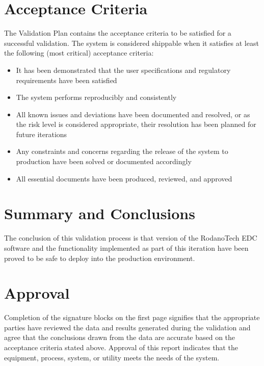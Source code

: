 \documentclass[11pt,a4paper,oneside]{article}
\begin{document}



\section{Acceptance Criteria}
The Validation Plan contains the acceptance criteria to be satisfied for a successful validation. The system is considered shippable when it satisfies at least the following (most critical) acceptance criteria:

\begin{itemize}
	\item It has been demonstrated that the user specifications and regulatory requirements have been satisfied
	\item The system performs reproducibly and consistently
	\item All known issues and deviations have been documented and resolved, or as the risk level is considered appropriate, their resolution has been planned for future iterations
	\item Any constraints and concerns regarding the release of the system to production have been solved or documented accordingly
	\item All essential documents have been produced, reviewed, and approved
\end{itemize}

\section{Summary and Conclusions}
The conclusion of this validation process is that version \version of the RodanoTech EDC software and the functionality implemented as part of this iteration have been proved to be safe to deploy into the production environment.

\section{Approval}
Completion of the signature blocks on the first page signifies that the appropriate parties have reviewed the data and results generated during the validation and agree that the conclusions drawn from the data are accurate based on the acceptance criteria stated above. Approval of this report indicates that the equipment, process, system, or utility meets the needs of the system.
\end{document}
